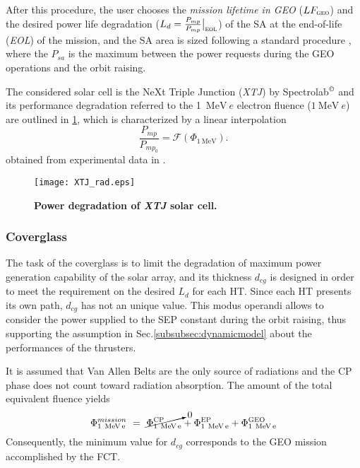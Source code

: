 After this procedure, the user chooses the \emph{mission lifetime in GEO} ($LF_{\textsc{geo}}$) and the desired power life degradation ($L_d=\tfrac{P_{mp}}{P_{mp}}\big|_{\textsc{eol}}$) of the SA at the end-of-life (\textit{EOL}) of the mission, and the SA area is sized following a standard procedure \cite{tesisimo}, where the $P_{sa}$ is the maximum between the power requests during the GEO operations and the orbit raising.

The considered solar cell is the NeXt Triple Junction (\textit{XTJ}) by Spectrolab$^\copyright$ and its performance degradation referred to the 1~$\si{\mega\electronvolt~e}$ electron fluence ($1~\si{\mega\electronvolt~e}$) are outlined in \figurename\ref{fig:powerdegradationofxtjsolarcell}, which is characterized by a linear interpolation
\begin{equation}
\dfrac{P_{mp}}{P_{mp_0}} = \mathcal{F}(\Phi_{1~\si{\mega\electronvolt}}).
\label{eq:xtjphi}
\end{equation} 
obtained from experimental data in \cite{fetzer2008production}.
\begin{figure}[htp]
\centering
\texttt{[image: XTJ\_rad.eps]}
\caption{\textbf{Power degradation of \textit{XTJ} solar cell.}}
\label{fig:powerdegradationofxtjsolarcell}
\end{figure}
\subsubsection{Coverglass}
The task of the coverglass is to limit the degradation of maximum power generation capability of the solar array, and its thickness $d_{cg}$ is designed in order to meet the requirement on the desired $L_d$ for each HT. Since each HT presents its own path, $d_{cg}$ has not an unique value. This modus operandi allows to consider the power supplied to the SEP constant during the orbit raising, thus supporting the assumption in Sec.\ref{subsubsec:dynamicmodel} about the performances of the thrusters.

It is assumed that Van Allen Belts are the only source of radiations and the CP phase does not count toward radiation absorption. The amount of the total equivalent fluence yields
\begin{equation}
\Phi_{\scriptstyle{1~\si{\mega\electronvolt~e}}}^{\scriptstyle{mission}}~=~\cancelto{0}{\Phi_{\scriptstyle{1~\si{\mega\electronvolt~e}}}^{\scriptstyle{\textsc{CP}}}}+%
\Phi_{\scriptstyle{1~\si{\mega\electronvolt~e}}}^{\scriptstyle{\textsc{EP}}}+%
\Phi_{\scriptstyle{1~\si{\mega\electronvolt~e}}}^{\scriptstyle{\textsc{GEO}}}
\label{eq:radiationcomputation}
\end{equation}
Consequently, the minimum value for $d_{cg}$ corresponds to the GEO mission accomplished by the FCT.

